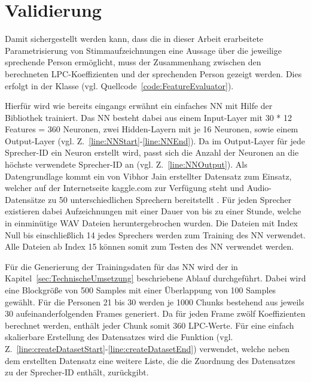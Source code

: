 \section{Validierung}\label{sec:Validierung}
Damit sichergestellt werden kann, dass die in dieser Arbeit erarbeitete Parametrisierung von Stimmaufzeichnungen eine Aussage über die jeweilige sprechende Person ermöglicht, muss der Zusammenhang zwischen den berechneten \ac{LPC}-Koeffizienten und der sprechenden Person gezeigt werden.
Dies erfolgt in der Klasse  (vgl. Quellcode~\ref{code:FeatureEvaluator}).

Hierfür wird wie bereits eingangs erwähnt ein einfaches \ac{NN} mit Hilfe der Bibliothek  trainiert.
Das \ac{NN} besteht dabei aus einem Input-Layer mit 30 * 12 Features = 360 Neuronen, zwei Hidden-Layern mit je 16 Neuronen, sowie einem Output-Layer (vgl. Z.~\ref{line:NNStart}-\ref{line:NNEnd}).
Da im Output-Layer für jede Sprecher-ID ein Neuron erstellt wird, passt sich die Anzahl der Neuronen an die höchste verwendete Sprecher-ID an (vgl. Z.~\ref{line:NNOutput}).
\newline
\newline
Als Datengrundlage kommt ein von Vibhor Jain erstellter Datensatz zum Einsatz, welcher auf der Internetseite kaggle.com zur Verfügung steht und Audio-Datensätze zu 50 unterschiedlichen Sprechern bereitstellt \autocite[vgl.][]{vibhor_jain_speaker_2019}.
Für jeden Sprecher existieren dabei Aufzeichnungen mit einer Dauer von bis zu einer Stunde, welche in einminütige WAV Dateien heruntergebrochen wurden.
Die Dateien mit Index Null bis einschließlich 14 jedes Sprechers werden zum Training des \ac{NN} verwendet.
Alle Dateien ab Index 15 können somit zum Testen des \ac{NN} verwendet werden.

Für die Generierung der Trainingsdaten für das \ac{NN} wird der in Kapitel~\ref{sec:TechnischeUmsetzung} beschriebene Ablauf durchgeführt.
Dabei wird eine Blockgröße von 500 Samples mit einer Überlappung von 100 Samples gewählt.
Für die Personen 21 bis 30 werden je 1000 Chunks bestehend aus jeweils 30 aufeinanderfolgenden Frames generiert.
Da für jeden Frame zwölf Koeffizienten berechnet werden, enthält jeder Chunk somit 360 \ac{LPC}-Werte.
Für eine einfach skalierbare Erstellung des Datensatzes wird die Funktion  (vgl. Z.~\ref{line:createDatasetStart}-\ref{line:createDatasetEnd}) verwendet, welche neben dem erstellten Datensatz eine weitere Liste, die die Zuordnung des Datensatzes zu der Sprecher-ID enthält, zurückgibt.

